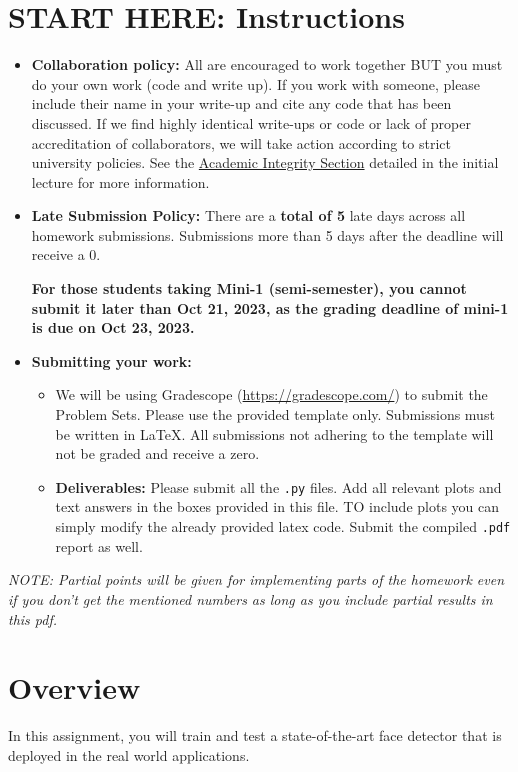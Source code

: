 \documentclass[11pt,addpoints,answers]{exam}
\begin{document}
\section*{START HERE: Instructions}
\begin{itemize}
\item \textbf{Collaboration policy:} All are encouraged to work together BUT you must do your own work (code and write up). If you work with someone, please include their name in your write-up and cite any code that has been discussed. If we find highly identical write-ups or code or lack of proper accreditation of collaborators, we will take action according to strict university policies. See the \href{hhttps://www.cmu.edu/policies/student-and-student-life/academic-integrity.html}{Academic Integrity Section} detailed in the initial lecture for more information.

\item\textbf{Late Submission Policy:} There are a \textbf{total of 5} late days across all homework submissions. Submissions more than 5 days after the deadline will receive a 0.

\textbf{For those students taking Mini-1 (semi-semester), you cannot submit it later than Oct 21, 2023, as the grading deadline of mini-1 is due on Oct 23, 2023.}

\item\textbf{Submitting your work:}

\begin{itemize}

\item We will be using Gradescope (\url{https://gradescope.com/}) to submit the Problem Sets. Please use the provided template only. Submissions must be written in LaTeX. All submissions not adhering to the template will not be graded and receive a zero. 
\item \textbf{Deliverables:} Please submit all the \texttt{.py} files. Add all relevant plots and text answers in the boxes provided in this file. TO include plots you can simply modify the already provided latex code. Submit the compiled \texttt{.pdf} report as well.
\end{itemize}
\end{itemize}
\emph{NOTE: Partial points will be given for implementing parts of the homework even if you don't get the mentioned numbers as long as you include partial results in this pdf.}
\clearpage

\section*{Overview}
In this assignment, you will train and test a state-of-the-art face detector that is deployed in the real world applications.
\end{document}
